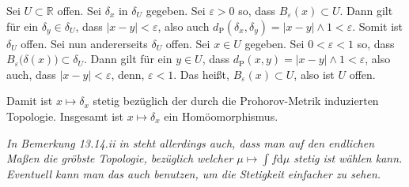 \documentclass{article}
\begin{document}
Sei $U\subset\mathbb{R}$ offen.
Sei $\delta_x$ in $\delta_U$ gegeben.
Sei $\varepsilon>0$ so, dass $B_\varepsilon(x)\subset U$.
Dann gilt für ein $\delta_y\in \delta_U$, dass $|x-y|<\varepsilon$, also auch $d_\mathrm{P}(\delta_x,\delta_y)=|x-y|\wedge1<\varepsilon$.
Somit ist $\delta_U$ offen.
Sei nun andererseits $\delta_U$ offen.
Sei $x\in U$ gegeben.
Sei $0<\varepsilon<1$ so, dass $B_\varepsilon\bigl(\delta(x)\bigr)\subset \delta_U$.
Dann gilt für ein $y\in U$, dass $d_\mathrm{P}(x,y)=|x-y|\wedge1<\varepsilon$, also auch, dass $|x-y|<\varepsilon$, denn, $\varepsilon<1$.
Das heißt, $B_\varepsilon(x)\subset U$, also ist $U$ offen.

Damit ist $x\mapsto\delta_x$ stetig bezüglich der durch die Prohorov-Metrik induzierten Topologie.
Insgesamt ist $x\mapsto \delta_x$ ein Homöomorphismus.

\emph{In Bemerkung 13.14.ii in \cite{klenke} steht allerdings auch, dass man auf den endlichen Maßen die gröbste Topologie, bezüglich welcher $\mu\mapsto\int f\mathrm{d}\mu$ stetig ist wählen kann.
Eventuell kann man das auch benutzen, um die Stetigkeit einfacher zu sehen.}


\end{document}
